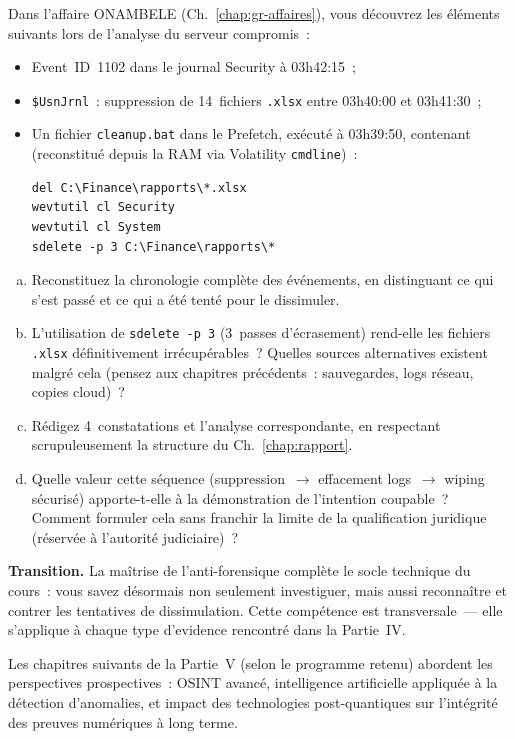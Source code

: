 \begin{boxexo}[title={\ding{45}\quad Exercice~21.3 --- Investigation complète avec anti-forensique \niveauexpert}]
Dans l'affaire ONAMBELE (Ch.~\ref{chap:gr-affaires}), vous découvrez
les éléments suivants lors de l'analyse du serveur compromis~:
\begin{itemize}
    \item Event~ID~1102 dans le journal Security à 03h42:15~;
    \item \texttt{\$UsnJrnl}~: suppression de 14~fichiers \texttt{.xlsx}
          entre 03h40:00 et 03h41:30~;
    \item Un fichier \texttt{cleanup.bat} dans le Prefetch, exécuté
          à 03h39:50, contenant (reconstitué depuis la RAM via
          Volatility \texttt{cmdline})~:
\begin{lstlisting}[language=bash_forensique]
del C:\Finance\rapports\*.xlsx
wevtutil cl Security
wevtutil cl System
sdelete -p 3 C:\Finance\rapports\*
\end{lstlisting}
\end{itemize}
\begin{enumerate}[(a)]
    \item Reconstituez la chronologie complète des événements,
          en distinguant ce qui s'est passé et ce qui a été
          tenté pour le dissimuler.
    \item L'utilisation de \texttt{sdelete -p~3} (3~passes
          d'écrasement) rend-elle les fichiers \texttt{.xlsx}
          définitivement irrécupérables~? Quelles sources
          alternatives existent malgré cela (pensez aux chapitres
          précédents~: sauvegardes, logs réseau, copies cloud)~?
    \item Rédigez 4~constatations et l'analyse correspondante,
          en respectant scrupuleusement la structure du
          Ch.~\ref{chap:rapport}.
    \item Quelle valeur cette séquence (suppression~$\to$
          effacement logs~$\to$ wiping sécurisé) apporte-t-elle
          à la démonstration de l'intention coupable~? Comment
          formuler cela sans franchir la limite de la qualification
          juridique (réservée à l'autorité judiciaire)~?
\end{enumerate}
\end{boxexo}

\bigskip

\begin{boxinfo}
\textbf{Transition.} La maîtrise de l'anti-forensique complète le
socle technique du cours~: vous savez désormais non seulement
investiguer, mais aussi reconnaître et contrer les tentatives de
dissimulation. Cette compétence est transversale~--- elle
s'applique à chaque type d'evidence rencontré dans la Partie~IV.

Les chapitres suivants de la Partie~V (selon le programme retenu)
abordent les perspectives prospectives~: OSINT avancé, intelligence
artificielle appliquée à la détection d'anomalies, et impact
des technologies post-quantiques sur l'intégrité des preuves
numériques à long terme.
\end{boxinfo}